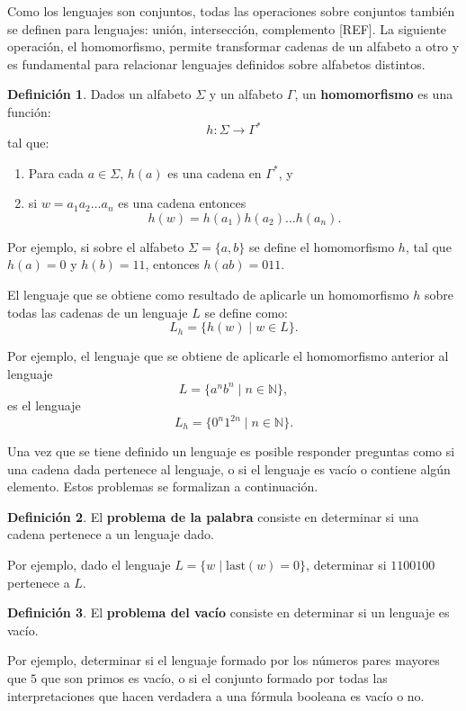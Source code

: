 \documentclass{report}
\theoremstyle{definition}
\newtheorem{definicion}{Definición}[chapter]
\theoremstyle{plain}
\theoremstyle{remark}
\begin{document}
Como los lenguajes son conjuntos, todas las operaciones sobre conjuntos
también se definen para lenguajes: unión, intersección, complemento
[REF]. La siguiente operación, el homomorfismo, permite transformar cadenas
de un alfabeto a otro y es fundamental para relacionar lenguajes definidos
sobre alfabetos distintos.

\begin{definicion}
Dados un alfabeto $\Sigma$ y un alfabeto $\Gamma$, un \textbf{homomorfismo}
es una función:
\[
  h : \Sigma \to \Gamma^*
\]
tal que:
\begin{enumerate}
  \item Para cada $a \in \Sigma$, $h(a)$ es una cadena en $\Gamma^*$, y
  \item si $w = a_1 a_2 \dots a_n$ es una cadena entonces
  \[
    h(w) = h(a_1) h(a_2) \dots h(a_n).
  \]
\end{enumerate}
\end{definicion}

Por ejemplo, si sobre el alfabeto $\Sigma = \{a, b\}$ se define el
homomorfismo $h$, tal que $h(a) = 0$ y $h(b) = 11$, entonces $h(ab) = 011$.

El lenguaje que se obtiene como resultado de aplicarle un homomorfismo $h$
sobre todas las cadenas de un lenguaje $L$ se define como:
\[
  L_h = \{ h(w) \mid w \in L \}.
\]

Por ejemplo, el lenguaje que se obtiene de aplicarle el homomorfismo
anterior al lenguaje
\[
  L = \{ a^n b^n \mid n \in \mathbb{N} \},
\]
es el lenguaje
\[
  L_h = \{ 0^n 1^{2n} \mid n \in \mathbb{N} \}.
\]

Una vez que se tiene definido un lenguaje es posible responder preguntas
como si una cadena dada pertenece al lenguaje, o si el lenguaje es vacío o
contiene algún elemento. Estos problemas se formalizan a continuación.

\begin{definicion}
El \textbf{problema de la palabra} consiste en determinar si una cadena
pertenece a un lenguaje dado.
\end{definicion}

Por ejemplo, dado el lenguaje $L = \{ w \mid \mathrm{last}(w) = 0 \}$,
determinar si $1100100$ pertenece a $L$.

\begin{definicion}
El \textbf{problema del vacío} consiste en determinar si un lenguaje es
vacío.
\end{definicion}

Por ejemplo, determinar si el lenguaje formado por los números pares
mayores que $5$ que son primos es vacío, o si el conjunto formado por
todas las interpretaciones que hacen verdadera a una fórmula booleana es
vacío o no.
\end{document}
